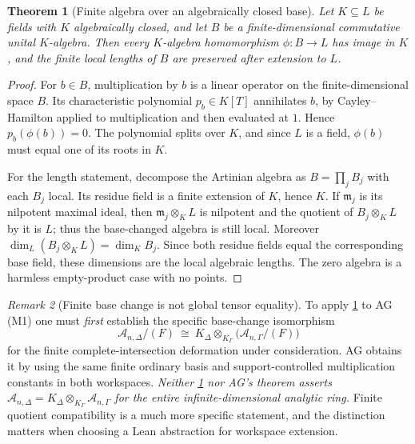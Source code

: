 \documentclass[11pt,letterpaper]{article}
\numberwithin{equation}{section}
\newtheorem{theorem}{Theorem}[section]
\theoremstyle{definition}
\theoremstyle{remark}
\newtheorem{remark}[theorem]{Remark}
\newcommand{\Ag}{\mathscr A}
\newcommand{\mm}{\mathfrak m}
\begin{document}
\begin{theorem}[Finite algebra over an algebraically closed base]\label{found:thm:finitepoints}
Let $K\subseteq L$ be fields with $K$ algebraically closed, and let $B$ be a
finite-dimensional commutative unital $K$-algebra. Then every $K$-algebra
homomorphism $\phi:B\to L$ has image in $K$, and the finite local lengths of $B$
are preserved after extension to $L$.
\end{theorem}
\begin{proof}
For $b\in B$, multiplication by $b$ is a linear operator on the
finite-dimensional space $B$. Its characteristic polynomial $p_b\in K[T]$
annihilates $b$, by Cayley--Hamilton applied to multiplication and then
evaluated at $1$. Hence $p_b(\phi(b))=0$. The polynomial splits over $K$, and
since $L$ is a field, $\phi(b)$ must equal one of its roots in $K$.

For the length statement, decompose the Artinian algebra as $B=\prod_j B_j$
with each $B_j$ local. Its residue field is a finite extension of $K$, hence
$K$. If $\mm_j$ is its nilpotent maximal ideal, then $\mm_j\otimes_K L$ is
nilpotent and the quotient of $B_j\otimes_K L$ by it is $L$; thus the
base-changed algebra is still local. Moreover
$\dim_L(B_j\otimes_K L)=\dim_K B_j$. Since both residue fields equal the
corresponding base field, these dimensions are the local algebraic lengths. The
zero algebra is a harmless empty-product case with no points.
\end{proof}

\begin{remark}[Finite base change is not global tensor equality]\label{found:rem:finitebasechange}
To apply \cref{found:thm:finitepoints} to AG (M1) one must \emph{first}
establish the specific base-change isomorphism
\begin{equation}\label{found:eq:finitebasechange}
 \Ag_{n,\Delta}/(F)\ \cong\
 K_\Delta\otimes_{K_\Gamma}\bigl(\Ag_{n,\Gamma}/(F)\bigr)
\end{equation}
for the finite complete-intersection deformation under consideration. AG obtains
it by using the same finite ordinary basis and support-controlled multiplication
constants in both workspaces. \emph{Neither \cref{found:thm:finitepoints} nor
AG's theorem asserts $\Ag_{n,\Delta}=K_\Delta\otimes_{K_\Gamma}\Ag_{n,\Gamma}$
for the entire infinite-dimensional analytic ring.} Finite quotient
compatibility is a much more specific statement, and the distinction matters
when choosing a Lean abstraction for workspace extension.
\end{remark}
\end{document}
